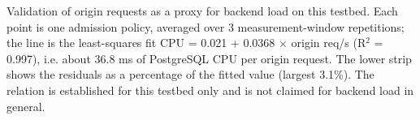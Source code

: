 Validation of origin requests as a proxy for backend load on this testbed. Each point is one admission policy, averaged over 3 measurement-window repetitions; the line is the least-squares fit CPU = 0.021 + 0.0368 $\times$ origin req/s (R$^{2}$ = 0.997), i.e. about 36.8 ms of PostgreSQL CPU per origin request. The lower strip shows the residuals as a percentage of the fitted value (largest 3.1\%). The relation is established for this testbed only and is not claimed for backend load in general.
